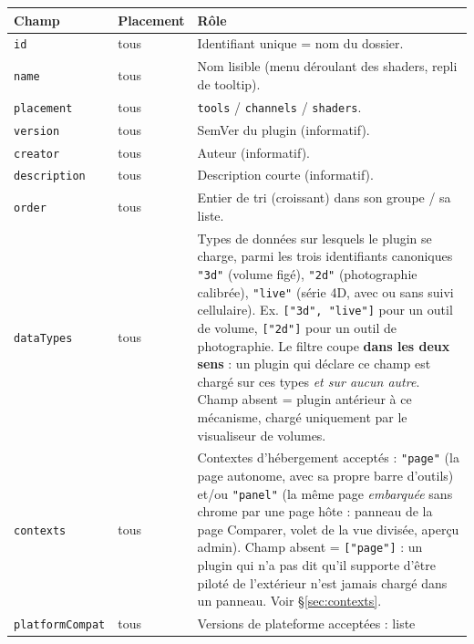 \documentclass[11pt,a4paper]{article}
\newcommand{\code}[1]{\texttt{#1}}
\begin{document}
\begin{center}
\begin{tabularx}{\linewidth}{@{}l l X@{}}
\toprule
\textbf{Champ} & \textbf{Placement} & \textbf{Rôle} \\
\midrule
\code{id}            & tous & Identifiant unique = nom du dossier. \\
\code{name}          & tous & Nom lisible (menu déroulant des shaders, repli de tooltip). \\
\code{placement}     & tous & \code{tools} / \code{channels} / \code{shaders}. \\
\code{version}       & tous & SemVer du plugin (informatif). \\
\code{creator}       & tous & Auteur (informatif). \\
\code{description}   & tous & Description courte (informatif). \\
\code{order}         & tous & Entier de tri (croissant) dans son groupe / sa liste. \\
\code{dataTypes}     & tous & Types de données sur lesquels le plugin se charge, parmi les
                              trois identifiants canoniques \code{"3d"} (volume figé),
                              \code{"2d"} (photographie calibrée), \code{"live"} (série 4D,
                              avec ou sans suivi cellulaire). Ex.
                              \code{["3d", "live"]} pour un outil de volume,
                              \code{["2d"]} pour un outil de photographie. Le filtre coupe
                              \textbf{dans les deux sens} : un plugin qui déclare ce champ est
                              chargé sur ces types \emph{et sur aucun autre}. Champ absent =
                              plugin antérieur à ce mécanisme, chargé uniquement par le
                              visualiseur de volumes. \\
\code{contexts}      & tous & Contextes d'hébergement acceptés : \code{"page"} (la page
                              autonome, avec sa propre barre d'outils) et/ou \code{"panel"}
                              (la même page \emph{embarquée} sans chrome par une page hôte :
                              panneau de la page Comparer, volet de la vue divisée, aperçu
                              admin). Champ absent = \code{["page"]} : un plugin qui n'a pas
                              dit qu'il supporte d'être piloté de l'extérieur n'est jamais
                              chargé dans un panneau. Voir §\ref{sec:contexts}. \\
\code{platformCompat} & tous & Versions de plateforme acceptées : liste

\end{tabularx}
\end{center}
\end{document}
